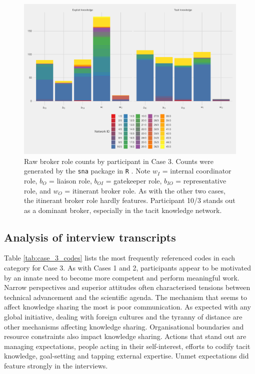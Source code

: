 \begin{figure}[hbt!]
\centering
\includegraphics[width = \textwidth]{Images/gf_case3.pdf}
\caption[Raw broker role counts by participant in Case 3]{Raw broker role counts by participant in Case 3. Counts were generated by the \texttt{sna} package in \texttt{R} \citep{butts2016sna}. Note $w_I$ = internal coordinator role, $b_O$ = liaison role, $b_{OI}$ = gatekeeper role, $b_{IO}$ = representative role, and $w_O$ = itinerant broker role. As with the other two cases, the itinerant broker role hardly features. Participant 10/3 stands out as a dominant broker, especially in the tacit knowledge network.}
\label{fig:gf_c3}
\end{figure}

\subsection{Analysis of interview transcripts}

Table \ref{tab:case_3_codes} lists the most frequently referenced codes in each category for Case 3. As with Cases 1 and 2, participants appear to be motivated by an innate need to become more competent and perform meaningful work. Narrow perspectives and superior attitudes often characterised tensions between technical advancement and the scientific agenda. The mechanism that seems to affect knowledge sharing the most is poor communication. As expected with any global initiative, dealing with foreign cultures and the tyranny of distance are other mechanisms affecting knowledge sharing. Organisational boundaries and resource constraints also impact knowledge sharing. Actions that stand out are managing expectations, people acting in their self-interest, efforts to codify tacit knowledge, goal-setting and tapping external expertise. Unmet expectations did feature strongly in the interviews.

